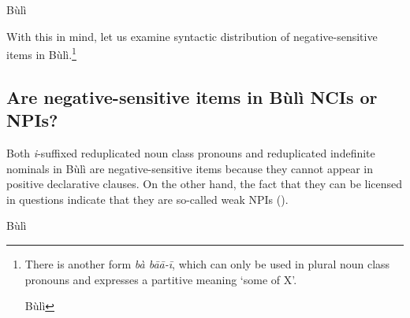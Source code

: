 \documentclass[output=paper,colorlinks,citecolor=brown]{langscibook}
\begin{document}
\ea Bùlì \label{waai}
\z
\z

With this in mind, let us examine syntactic distribution of negative-sensitive items in Bùlì.\footnote{There is another form \textit{bà bāā-ī}, which can only be used in plural noun class pronouns and expresses a partitive meaning `some of X'.


\ea Bùlì
\z
\z
}



\subsection{Are negative-sensitive items in Bùlì NCIs or NPIs?}

Both \textit{i}-suffixed reduplicated noun class pronouns  and reduplicated indefinite nominals in Bùlì are negative-sensitive items because they cannot appear in positive declarative clauses. On the other hand, the fact that they can be licensed in questions indicate that they are so-called weak NPIs (\citealt{VanDerWouden1997}).



\ea Bùlì
\z
\z
\end{document}
